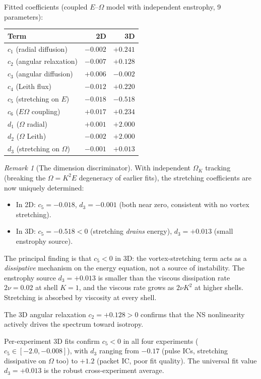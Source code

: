 \documentclass[11pt,a4paper]{article}
\theoremstyle{remark}
\newtheorem{remark}[theorem]{Remark}
\begin{document}
Fitted coefficients (coupled $E$--$\Omega$ model with independent enstrophy, 9 parameters):
\begin{center}
\begin{tabular}{lrr}
\toprule
Term & 2D & 3D \\
\midrule
$c_1$ (radial diffusion)      & $-0.002$ & $+0.241$ \\
$c_2$ (angular relaxation)    & $-0.007$ & $+0.128$ \\
$c_3$ (angular diffusion)     & $+0.006$ & $-0.002$ \\
$c_4$ (Leith flux)            & $-0.012$ & $+0.220$ \\
$c_5$ (stretching on $E$)     & $-0.018$ & $-0.518$ \\
$c_6$ ($E\Omega$ coupling)    & $+0.017$ & $+0.234$ \\
\midrule
$d_1$ ($\Omega$ radial)       & $+0.001$ & $+2.000$ \\
$d_2$ ($\Omega$ Leith)        & $-0.002$ & $+2.000$ \\
$d_3$ (stretching on $\Omega$) & $-0.001$ & $+0.013$ \\
\bottomrule
\end{tabular}
\end{center}

\begin{remark}[The dimension discriminator]\label{rem:3d-sigma}
With independent $\Omega_K$ tracking (breaking the $\Omega = K^2 E$ degeneracy of earlier fits), the stretching coefficients are now uniquely determined:
\begin{itemize}
\item In 2D: $c_5 = -0.018$, $d_3 = -0.001$ (both near zero, consistent with no vortex stretching).
\item In 3D: $c_5 = -0.518 < 0$ (stretching \emph{drains} energy), $d_3 = +0.013$ (small enstrophy source).
\end{itemize}

The principal finding is that $c_5 < 0$ in 3D: the vortex-stretching term acts as a \emph{dissipative} mechanism on the energy equation, not a source of instability.  The enstrophy source $d_3 = +0.013$ is smaller than the viscous dissipation rate $2\nu = 0.02$ at shell $K = 1$, and the viscous rate grows as $2\nu K^2$ at higher shells.  Stretching is absorbed by viscosity at every shell.

The 3D angular relaxation $c_2 = +0.128 > 0$ confirms that the NS nonlinearity actively drives the spectrum toward isotropy.

Per-experiment 3D fits confirm $c_5 < 0$ in all four experiments ($c_5 \in [-2.0, -0.008]$), with $d_3$ ranging from $-0.17$ (pulse ICs, stretching dissipative on $\Omega$ too) to $+1.2$ (packet IC, poor fit quality).  The universal fit value $d_3 = +0.013$ is the robust cross-experiment average.
\end{remark}
\end{document}
